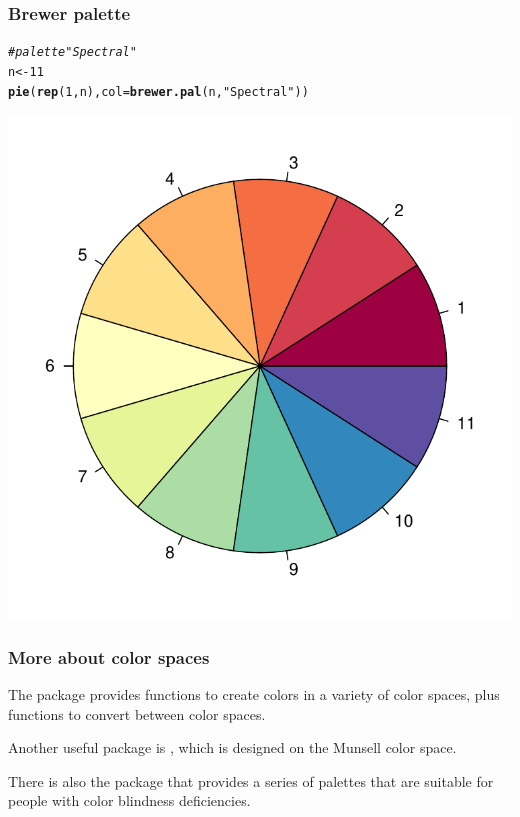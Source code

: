 \documentclass[12pt]{beamer}\usepackage[]{graphicx}\usepackage[]{color}
\makeatletter
\newcommand{\hlnum}[1]{\textcolor[rgb]{0.686,0.059,0.569}{#1}}%
\newcommand{\hlstr}[1]{\textcolor[rgb]{0.192,0.494,0.8}{#1}}%
\newcommand{\hlcom}[1]{\textcolor[rgb]{0.678,0.584,0.686}{\textit{#1}}}%
\newcommand{\hlstd}[1]{\textcolor[rgb]{0.345,0.345,0.345}{#1}}%
\newcommand{\hlkwb}[1]{\textcolor[rgb]{0.69,0.353,0.396}{#1}}%
\newcommand{\hlkwc}[1]{\textcolor[rgb]{0.333,0.667,0.333}{#1}}%
\newcommand{\hlkwd}[1]{\textcolor[rgb]{0.737,0.353,0.396}{\textbf{#1}}}%
\newenvironment{kframe}{%
 \def\at@end@of@kframe{}%
 \ifinner\ifhmode%
  \def\at@end@of@kframe{\end{minipage}}%
  \begin{minipage}{\columnwidth}%
 \fi\fi%
 \def\FrameCommand##1{\hskip\@totalleftmargin \hskip-\fboxsep
 \colorbox{shadecolor}{##1}\hskip-\fboxsep
     \hskip-\linewidth \hskip-\@totalleftmargin \hskip\columnwidth}%
 \MakeFramed {\advance\hsize-\width
   \@totalleftmargin\z@ \linewidth\hsize
   \@setminipage}}%
 {\par\unskip\endMakeFramed%
 \at@end@of@kframe}
\newenvironment{knitrout}{}{} %
\makeatother
\begin{document}
\begin{frame}[fragile]
\frametitle{Brewer palette}
\begin{knitrout}\scriptsize
{}\color{fgcolor}\begin{kframe}
\begin{alltt}
\hlcom{# palette "Spectral"}
\hlstd{n} \hlkwb{<-} \hlnum{11}
\hlkwd{pie}\hlstd{(}\hlkwd{rep}\hlstd{(}\hlnum{1}\hlstd{, n),} \hlkwc{col} \hlstd{=} \hlkwd{brewer.pal}\hlstd{(n,} \hlstr{"Spectral"}\hlstd{))}
\end{alltt}
\end{kframe}

{\centering \includegraphics[width=.4\linewidth,height=.4\linewidth]{figure/spectral-1} 

}



\end{knitrout}
\end{frame}


\begin{frame}[fragile]
\frametitle{More about color spaces}

\bi 
 \item The package  provides functions to create colors in a variety of color spaces, plus functions to convert between color spaces.
 \item Another useful package is , which is designed on the Munsell color space.
 \item There is also the  package that provides a series of palettes that are suitable for people with color blindness deficiencies.
\ei

\end{frame}


\begin{frame}
\begin{center}
\Huge{}
\end{center}
\end{frame}
\end{document}

